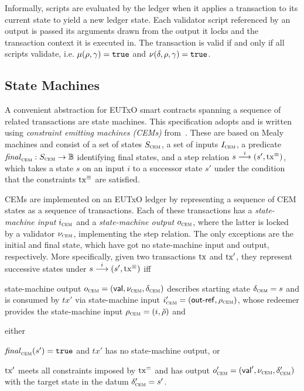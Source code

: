 Informally, scripts are evaluated by the ledger when it applies a transaction to
its current state to yield a new ledger state. Each validator script referenced
by an output is passed its arguments drawn from the output it locks and the
transaction context it is executed in. The transaction is valid if and only if
all scripts validate, i.e. $\mu(\rho, \gamma) = \mathtt{true}$ and
$\nu(\delta, \rho, \gamma) = \mathtt{true}$.

\subsection{State Machines}\label{sec:cem}

A convenient abstraction for EUTxO smart contracts spanning a sequence of
related transactions are state machines. This specification adopts and is
written using \emph{constraint emitting machines (CEMs)} from~\cite{eutxo}.
These are based on Mealy machines and consist of a set of states $S_{\textsc{cem}}$, a set
of inputs $I_{\textsc{cem}}$, a predicate \(\mathit{final}_{\textsc{cem}} : S_{\textsc{cem}}\to\mathbb{B}\) identifying final
states, and a step relation \({s}\overset{i}\longrightarrow(s', \mathrm{tx}^\equiv)\), which takes a
state $s$ on an input $i$ to a successor state $s'$ under the condition that the
constraints $\mathrm{tx}^\equiv$ are satisfied.

CEMs are implemented on an EUTxO ledger by representing a sequence of CEM states
as a sequence of transactions. Each of these transactions has a
\emph{state-machine input} $i_{\textsc{cem}}$ and a \emph{state-machine output} $o_{\textsc{cem}}$,
where the latter is locked by a validator $\nu_{\textsc{cem}}$, implementing the step
relation. The only exceptions are the initial and final state, which have got no
state-machine input and output, respectively. More specifically, given two
transactions $\mathrm{tx}$ and $\mathrm{tx}'$, they represent successive states under
\({s}\overset{i}\longrightarrow(s', \mathrm{tx}^\equiv)\) iff

\begin{mitemize}
  \item state-machine output $o_{\textsc{cem}} = (\mathsf{val}, \nu_{\textsc{cem}}, \delta_{\textsc{cem}})$
  describes starting state $\delta_{\textsc{cem}} = s$ and is consumed by $tx'$ via
  state-machine input $i_{\textsc{cem}}' = (\mathsf{out\textsf{-}{}ref}, \rho_{\textsc{cem}})$, whose redeemer
  provides the state-machine input $\rho_{\textsc{cem}} = (i, \tilde{\rho})$ and
  \item either
    \begin{mitemize}
      \item $\mathit{final}_{\textsc{cem}}(s') = \mathtt{true}$ and $tx'$ has no state-machine output, or
      \item $\mathrm{tx}'$ meets all constraints imposed by $\mathrm{tx}^\equiv$ and has output
      $o_{\textsc{cem}}' = (\mathsf{val}', \nu_{\textsc{cem}}, \delta_{\textsc{cem}}')$ with the target state in
      the datum $\delta_{\textsc{cem}}' = s'$.
    \end{mitemize}
\end{mitemize}


